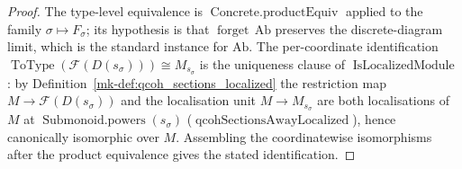 \begin{proof}
  The type-level equivalence is \(\operatorname{Concrete.productEquiv}\) applied to the
  family \(\sigma \mapsto F_\sigma\); its hypothesis is that
  \(\operatorname{forget}\,\mathrm{Ab}\) preserves the discrete-diagram limit, which is
  the standard instance for \(\mathrm{Ab}\). The per-coordinate identification
  \(\operatorname{ToType}(\mathcal{F}(D(s_\sigma))) \cong M_{s_\sigma}\) is the
  uniqueness clause of \(\operatorname{IsLocalizedModule}\): by
  Definition~\ref{mk-def:qcoh_sections_localized} the restriction map
  \(M \to \mathcal{F}(D(s_\sigma))\) and the localisation unit
  \(M \to M_{s_\sigma}\) are both localisations of \(M\) at
  \(\operatorname{Submonoid.powers}(s_\sigma)\)
  (\(\operatorname{qcohSectionsAwayLocalized}\)), hence canonically isomorphic over
  \(M\). Assembling the coordinatewise isomorphisms after the product equivalence gives
  the stated identification.
\end{proof}

